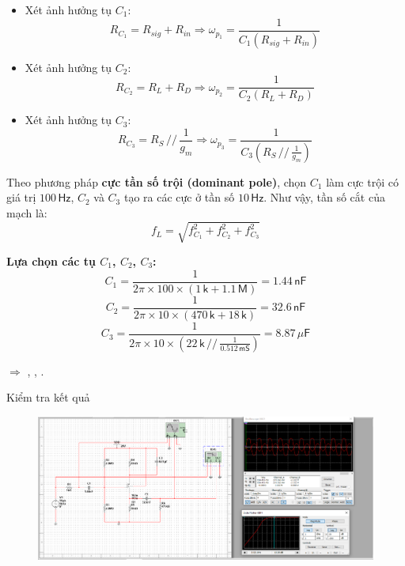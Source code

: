 
\begin{itemize}[label=-]
	\item Xét ảnh hưởng tụ $C_{1}$: 
	\[
	R_{C_{1}}=R_{sig}+R_{in}
	\Longrightarrow \omega_{p_{1}}=\frac{1}{C_{1}\left(R_{sig}+R_{in}\right)}
	\]
	
	\item Xét ảnh hưởng tụ $C_{2}$: 
	\[
	R_{C_{2}}=R_{L}+R_{D}
	\Longrightarrow \omega_{p_{2}}=\frac{1}{C_{2}\left(R_{L}+R_{D}\right)}
	\]
	
	\item Xét ảnh hưởng tụ $C_{3}$: 
	\[
	R_{C_{3}}=R_{S}\,//\,\frac{1}{g_{m}}
	\Longrightarrow \omega_{p_{3}}=\frac{1}{C_{3}\left(R_{S}\,//\,\frac{1}{g_{m}}\right)}
	\]
\end{itemize}

Theo phương pháp \textbf{cực tần số trội (dominant pole)}, chọn $C_{1}$ làm cực trội có giá trị $100\,\textsf{Hz}$, 
$C_{2}$ và $C_{3}$ tạo ra các cực ở tần số $10\,\textsf{Hz}$.  
Như vậy, tần số cắt của mạch là:
\[
f_{L}=\sqrt{f_{C_{1}}^{2}+f_{C_{2}}^{2}+f_{C_{3}}^{2}}
\]

\textbf{Lựa chọn các tụ $C_{1}$, $C_{2}$, $C_{3}$:}
\[
C_{1}=\frac{1}{2\pi\times100\times\left(1\,\textsf{k}+1.1\,\textsf{M}\right)}=1.44\,\textsf{nF}
\]
\[
C_{2}=\frac{1}{2\pi\times10\times(470\,\textsf{k}+18\,\textsf{k})}=32.6\,\textsf{nF}
\]
\[
C_{3}=\frac{1}{2\pi\times10\times\left(22\,\textsf{k}\,//\,\frac{1}{0.512\,\textsf{mS}}\right)}=8.87\,\mu\textsf{F}
\]

$\Rightarrow$ , , .

Kiểm tra kết quả

\begin{figure}[H]
	\centering
	\includegraphics[width=\linewidth]{./my-chapters/my-images/Question1/Câu 1 Hình 2 d.png}
\end{figure}

